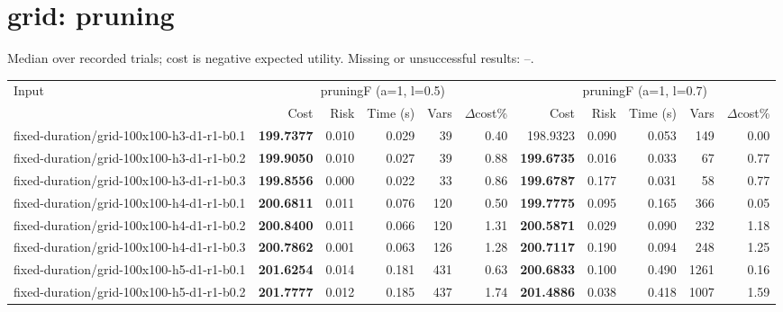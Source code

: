 \documentclass[10pt]{article}
\begin{document}
\section*{grid: pruning}
\noindent Median over recorded trials; cost is negative expected utility. Missing or unsuccessful results: --.\par
\small\begin{tabular}{p{65mm}rrrrrrrrrr}
\toprule
Input & \multicolumn{5}{c}{pruningF (a=1, l=0.5)} & \multicolumn{5}{c}{pruningF (a=1, l=0.7)} \\
 & Cost & Risk & Time (s) & Vars & $\Delta$cost\% & Cost & Risk & Time (s) & Vars & $\Delta$cost\% \\
\midrule
fixed-\allowbreak duration/\allowbreak grid-\allowbreak 100x100-\allowbreak h3-\allowbreak d1-\allowbreak r1-\allowbreak b0.1 & \textbf{199.7377} & 0.010 & 0.029 & 39 & 0.40 & 198.9323 & 0.090 & 0.053 & 149 & 0.00 \\
fixed-\allowbreak duration/\allowbreak grid-\allowbreak 100x100-\allowbreak h3-\allowbreak d1-\allowbreak r1-\allowbreak b0.2 & \textbf{199.9050} & 0.010 & 0.027 & 39 & 0.88 & \textbf{199.6735} & 0.016 & 0.033 & 67 & 0.77 \\
fixed-\allowbreak duration/\allowbreak grid-\allowbreak 100x100-\allowbreak h3-\allowbreak d1-\allowbreak r1-\allowbreak b0.3 & \textbf{199.8556} & 0.000 & 0.022 & 33 & 0.86 & \textbf{199.6787} & 0.177 & 0.031 & 58 & 0.77 \\
fixed-\allowbreak duration/\allowbreak grid-\allowbreak 100x100-\allowbreak h4-\allowbreak d1-\allowbreak r1-\allowbreak b0.1 & \textbf{200.6811} & 0.011 & 0.076 & 120 & 0.50 & \textbf{199.7775} & 0.095 & 0.165 & 366 & 0.05 \\
fixed-\allowbreak duration/\allowbreak grid-\allowbreak 100x100-\allowbreak h4-\allowbreak d1-\allowbreak r1-\allowbreak b0.2 & \textbf{200.8400} & 0.011 & 0.066 & 120 & 1.31 & \textbf{200.5871} & 0.029 & 0.090 & 232 & 1.18 \\
fixed-\allowbreak duration/\allowbreak grid-\allowbreak 100x100-\allowbreak h4-\allowbreak d1-\allowbreak r1-\allowbreak b0.3 & \textbf{200.7862} & 0.001 & 0.063 & 126 & 1.28 & \textbf{200.7117} & 0.190 & 0.094 & 248 & 1.25 \\
fixed-\allowbreak duration/\allowbreak grid-\allowbreak 100x100-\allowbreak h5-\allowbreak d1-\allowbreak r1-\allowbreak b0.1 & \textbf{201.6254} & 0.014 & 0.181 & 431 & 0.63 & \textbf{200.6833} & 0.100 & 0.490 & 1261 & 0.16 \\
fixed-\allowbreak duration/\allowbreak grid-\allowbreak 100x100-\allowbreak h5-\allowbreak d1-\allowbreak r1-\allowbreak b0.2 & \textbf{201.7777} & 0.012 & 0.185 & 437 & 1.74 & \textbf{201.4886} & 0.038 & 0.418 & 1007 & 1.59 \\

\end{tabular}
\end{document}
